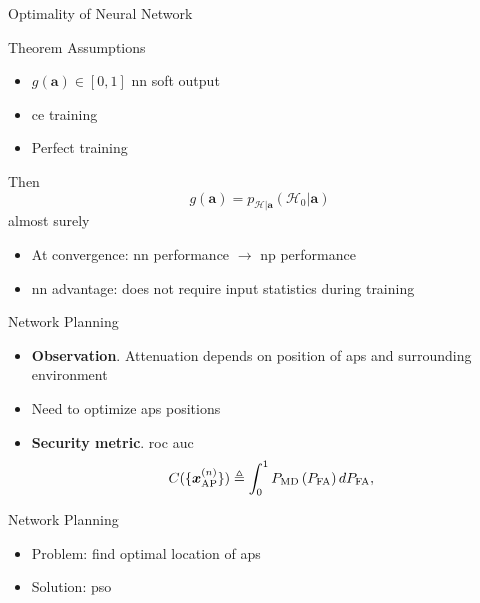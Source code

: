\documentclass[10pt]{beamer}
\newcommand{\gy}{g(\bm a)}
\begin{document}
\begin{frame}{Optimality of Neural Network}

\begin{block}{Theorem}
	Assumptions
	\begin{itemize}
		\item $\gy \in [0,1]$ \ac{nn} soft output
		\item \ac{ce} training
		\item Perfect training
	\end{itemize}
Then
\begin{equation*}
\gy = p_{\mathcal H|\bm a}(\mathcal{H}_0|\bm a)	
\end{equation*}
almost surely
\end{block}
\begin{itemize}
\item At convergence: \ac{nn} performance $\to$ \ac{np} performance
\item \ac{nn} advantage: does not require input statistics during training
\end{itemize}
\end{frame}

\begin{frame}{Network Planning}
\begin{itemize}
\item \textbf{Observation}. Attenuation depends on position of \acp{ap} and surrounding environment 
\item Need to optimize \acp{ap} positions
\item \textbf{Security metric}. \Ac{roc} \ac{auc}
\begin{equation*}
C(\{\bm{x}_{\rm AP}^{(n)}\})  \triangleq \int_{0}^{1} P_{\rm MD}\left(P_{\rm FA}\right) d P_{\rm FA},
\end{equation*}

\end{itemize}
\begin{block}{Network Planning}
\begin{itemize}
\item Problem: find optimal location of \acp{ap}
\item Solution: \ac{pso}
\end{itemize}
\end{block}
\end{frame}
\end{document}
